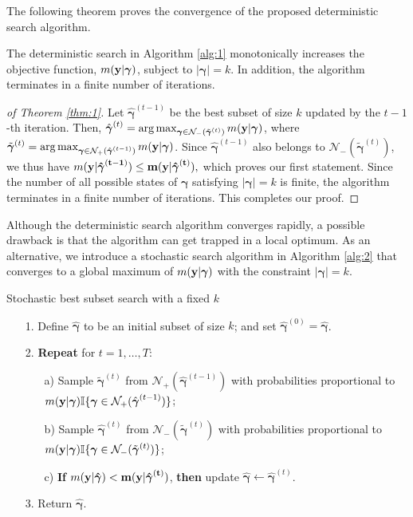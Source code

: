 \documentclass[twocolumn]{svjour3}       %
\newcommand{\uy}{\bf y} %
\newcommand{\0}{\boldsymbol 0} %
\newcommand{\1}{\boldsymbol 1} %
\newcommand{\bg}{\boldsymbol \gamma} %
\begin{document}
The following theorem proves the convergence of the proposed deterministic search algorithm.
\begin{theorem}\label{thm:1} The deterministic search in Algorithm \ref{alg:1} monotonically increases the objective function, $m(\uy|\bg)$, subject to $|\bg|=k$. In addition, the algorithm terminates in a finite number of iterations.
\end{theorem}
\begin{proof}[of Theorem \ref{thm:1}] Let $\hat{\bg}^{(t-1)}$ be the best subset of size $k$ updated by the ${t-1}$-th iteration. Then, $\hat{\bg}^{(t)} = \arg\max_{\bg  \in \mathcal{N}_-(\tilde{\bg}^{(t)} ) } m(\uy|\bg)$, where $\tilde{\bg}^{(t)}=\arg\max_{\bg  \in \mathcal{N}_+(\hat{\bg}^{(t-1)}  ) } m(\uy|\bg)$. Since $\hat{\bg}^{(t-1)}$ also belongs to $ \mathcal{N}_-(\tilde{\bg}^{(t)} ) $, we thus have $m(\uy|\hat{\bg}^{(t-1)} ) \leq m(\uy|\hat{\bg}^{(t)}),$ which proves our first statement. Since the number of all possible states of $\bg$ satisfying $|\bg|=k$ is finite, the algorithm terminates in a finite number of iterations. This completes our proof.
\end{proof}
Although the deterministic search algorithm converges rapidly, a possible drawback is that the algorithm can get trapped in a local optimum. As an alternative, we introduce a stochastic search algorithm in Algorithm \ref{alg:2} that converges to a global maximum of $m(\uy|\bg)$ with the constraint $|\bg|=k$.
\begin{algorithm}[ht!]
\caption{Stochastic best subset search with a fixed $k$}\label{alg:2}
\begin{itemize}\itemsep=0pt
\item[1.] Define $\hat{\bg}$ to be an initial subset of size $k$; and set $\hat{\bg}^{(0)}=\hat{\bg}$.
\item[2.] \textbf{Repeat} for $t=1,\ldots,T$:
\begin{itemize}\itemsep=0pt
\item[a)] Sample $\tilde{\bg}^{(t)}$ from $\mathcal{N}_+(\hat{\bg}^{(t-1)} )$ with probabilities proportional to ${m(\uy|\bg)}\mathbb{I}\{\bg \in \mathcal{N}_+(\hat{\bg}^{(t-1)} ) \}$; 
\item[b)] Sample $\hat{\bg}^{(t)}$ from $\mathcal{N}_-(\tilde{\bg}^{(t)} )$ with probabilities proportional to ${m(\uy|\bg)}\mathbb{I}\{\bg \in \mathcal{N}_-(\tilde{\bg}^{(t)} ) \}$;
\item[c)] \textbf{If} $m(\uy|\hat{\bg})<m(\uy|\hat{\bg}^{(t)})$, \textbf{then} update $\hat{\bg}\leftarrow \hat{\bg}^{(t)}$.
\end{itemize}
\item[3.] Return $\hat{\bg}$.
\end{itemize}
\end{algorithm}
\end{document}
